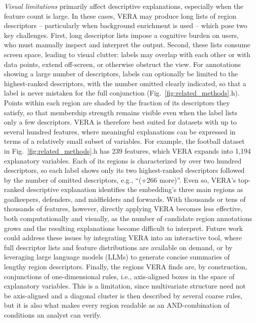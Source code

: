 \documentclass[lettersize,journal]{IEEEtran}
\begin{document}
\textit{Visual limitations} primarily affect descriptive explanations, especially when the feature count is large. In these cases, VERA may produce long lists of region descriptors -- particularly when background enrichment is used -- which pose two key challenges.
First, long descriptor lists impose a cognitive burden on users, who must manually inspect and interpret the output. Second, these lists consume screen space, leading to visual clutter: labels may overlap with each other or with data points, extend off-screen, or otherwise obstruct the view.
For annotations showing a large number of descriptors, labels can optionally be limited to the highest-ranked descriptors, with the number omitted clearly indicated, so that a label is never mistaken for the full conjunction (Fig.~\ref{fig:related_methods}.h).
Points within each region are shaded by the fraction of its descriptors they satisfy, so that membership strength remains visible even when the label lists only a few descriptors.
VERA is therefore best suited for datasets with up to several hundred features, where meaningful explanations can be expressed in terms of a relatively small subset of variables.
For example, the football dataset in Fig.~\ref{fig:related_methods}.h has 239 features, which VERA expands into 1,194 explanatory variables. Each of its regions is characterized by over two hundred descriptors, so each label shows only its two highest-ranked descriptors followed by the number of omitted descriptors, e.g., ``(+266 more)''. Even so, VERA's top-ranked descriptive explanation identifies the embedding's three main regions as goalkeepers, defenders, and midfielders and forwards.
With thousands or tens of thousands of features, however, directly applying VERA becomes less effective, both computationally and visually, as the number of candidate region annotations grows and the resulting explanations become difficult to interpret.
Future work could address these issues by integrating VERA into an interactive tool, where full descriptor lists and feature distributions are available on demand, or by leveraging large language models (LLMs) to generate concise summaries of lengthy region descriptors.
Finally, the regions VERA finds are, by construction, conjunctions of one-dimensional rules, i.e., axis-aligned boxes in the space of explanatory variables.
This is a limitation, since multivariate structure need not be axis-aligned and a diagonal cluster is then described by several coarse rules, but it is also what makes every region readable as an AND-combination of conditions an analyst can verify.
\end{document}
